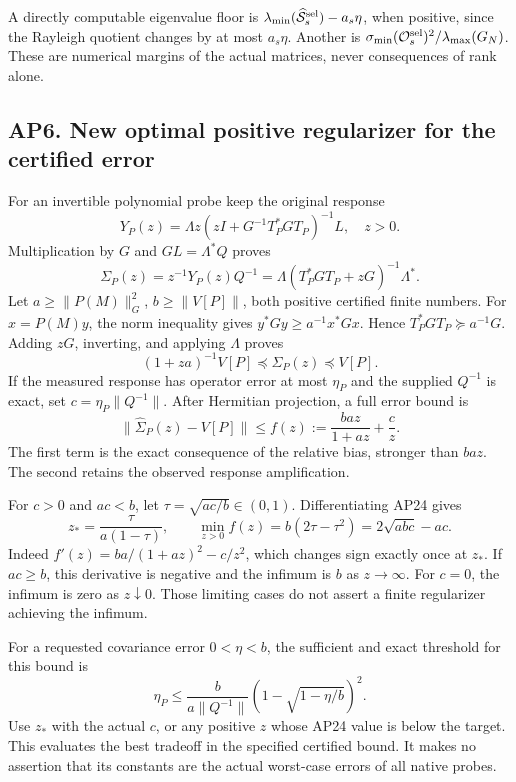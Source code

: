 \documentclass[11pt]{article}
\begin{document}
A directly computable eigenvalue floor is \(\lambda_{\min}(\widehat{\mathcal S}^{\rm sel}_s)-a_s\eta\), when positive, since the Rayleigh quotient changes by at most \(a_s\eta\). Another is \(\sigma_{\min}(\mathcal O_s^{\rm sel})^2/\lambda_{\max}(G_N)\). These are numerical margins of the actual matrices, never consequences of rank alone.

\subsection{AP6. New optimal positive regularizer for the certified error}\label{ap6.-new-optimal-positive-regularizer-for-the-certified-error}

For an invertible polynomial probe keep the original response \[
 Y_P(z)=\Lambda z(zI+G^{-1}T_P^*GT_P)^{-1}L,\quad z>0.
\] Multiplication by \(G\) and \(GL=\Lambda^*Q\) proves \[
 \Sigma_P(z)=z^{-1}Y_P(z)Q^{-1}
 =\Lambda(T_P^*GT_P+zG)^{-1}\Lambda^*. \tag{AP23}
\] Let \(a\ge\|P(M)\|_G^2\), \(b\ge\|V[P]\|\), both positive certified finite numbers. For \(x=P(M)y\), the norm inequality gives \(y^*Gy\ge a^{-1}x^*Gx\). Hence \(T_P^*GT_P\succeq a^{-1}G\). Adding \(zG\), inverting, and applying \(\Lambda\) proves \[
 (1+za)^{-1}V[P]\preceq\Sigma_P(z)\preceq V[P].
\] If the measured response has operator error at most \(\eta_P\) and the supplied \(Q^{-1}\) is exact, set \(c=\eta_P\|Q^{-1}\|\). After Hermitian projection, a full error bound is \[
 \|\widehat\Sigma_P(z)-V[P]\|
 \le f(z):=\frac{baz}{1+az}+\frac c z. \tag{AP24}
\] The first term is the exact consequence of the relative bias, stronger than \(baz\). The second retains the observed response amplification.

For \(c>0\) and \(ac<b\), let \(\tau=\sqrt{ac/b}\in(0,1)\). Differentiating AP24 gives \[
 z_*=\frac{\tau}{a(1-\tau)},\qquad
 \min_{z>0}f(z)=b(2\tau-\tau^2)=2\sqrt{abc}-ac. \tag{AP25}
\] Indeed \(f'(z)=ba/(1+az)^2-c/z^2\), which changes sign exactly once at \(z_*\). If \(ac\ge b\), this derivative is negative and the infimum is \(b\) as \(z\to\infty\). For \(c=0\), the infimum is zero as \(z\downarrow0\). Those limiting cases do not assert a finite regularizer achieving the infimum.

For a requested covariance error \(0<\eta<b\), the sufficient and exact threshold for this bound is \[
 \eta_P\le
 \frac{b}{a\|Q^{-1}\|}
 \left(1-\sqrt{1-\eta/b}\right)^2. \tag{AP26}
\] Use \(z_*\) with the actual \(c\), or any positive \(z\) whose AP24 value is below the target. This evaluates the best tradeoff in the specified certified bound. It makes no assertion that its constants are the actual worst-case errors of all native probes.
\end{document}
